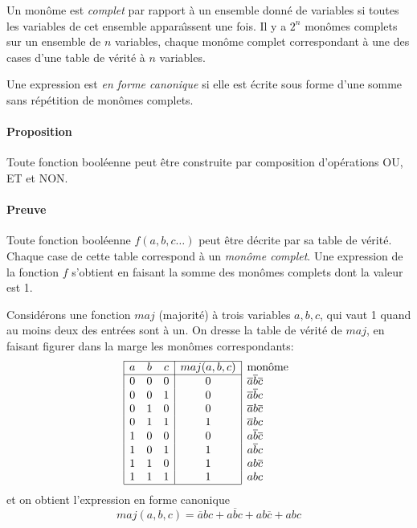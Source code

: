 Un mon\^ome est {\em complet} par rapport \`a un ensemble donn\'e de variables
si toutes les variables de cet ensemble appara\^{\i}ssent une fois. Il y a 
$2^n$ mon\^omes complets sur un ensemble de $n$ variables, chaque mon\^ome
complet correspondant \`a une des cases d'une table de v\'erit\'e \`a $n$ variables.

Une expression est {\em en forme canonique} si elle est  \'ecrite sous forme
d'une somme sans r\'ep\'etition de mon\^omes complets.


\paragraph{Proposition} Toute fonction bool\'eenne peut \^etre construite
par composition d'op\'erations OU, ET et NON.


\paragraph{Preuve} Toute fonction bool\'eenne $f(a,b,c\ldots)$ peut \^etre 
d\'ecrite par sa table de v\'erit\'e. Chaque case de cette table correspond
\`a un {\em mon\^ome complet}. Une expression de la fonction $f$ s'obtient
en faisant la somme des mon\^omes complets dont la valeur est 1.

\begin{exemple}{} Consid\'erons une fonction $maj$ (majorit\'e) \`a trois variables $a,b,c$, qui 
vaut 1 quand au moins deux des entr\'ees sont \`a un. On dresse la table de
v\'erit\'e de $maj$, en faisant figurer dans la marge les mon\^omes correspondants:
$$\begin{array}{|ccc|c|l}
\cline{1-4}
a & b & c & maj(a,b,c) & \mbox{mon\^ome} \\
\cline{1-4}
0 & 0 & 0 & 0 & \overline{a}\overline{b}\overline{c} \\
0 & 0 & 1 & 0 & \overline{a}\overline{b}c \\
0 & 1 & 0 & 0 & \overline{a}b\overline{c} \\
0 & 1 & 1 & 1 & \overline{a}bc \\
1 & 0 & 0 & 0 & a\overline{b}\overline{c} \\
1 & 0 & 1 & 1 & a\overline{b}c \\
1 & 1 & 0 & 1 & ab\overline{c} \\
1 & 1 & 1 & 1 & abc \\
\cline{1-4}
\end{array} $$
et on obtient l'expression en forme canonique $$
	maj(a,b,c)=  \overline{a}bc + a\overline{b}c +
	ab\overline{c} + abc$$
\end{exemple}

